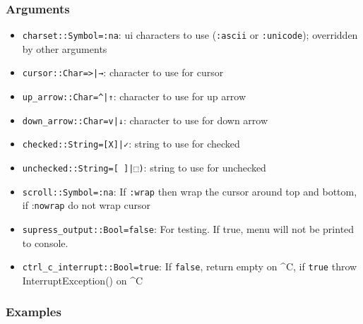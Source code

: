 \hypertarget{10322653734691696332}{}


\subsubsection{Arguments}



\begin{itemize}
\item \texttt{charset::Symbol=:na}: ui characters to use (\texttt{:ascii} or \texttt{:unicode}); overridden by other arguments


\item \texttt{cursor::Char={\textquotesingle}>{\textquotesingle}|{\textquotesingle}→{\textquotesingle}}: character to use for cursor


\item \texttt{up\_arrow::Char={\textquotesingle}{\textasciicircum}{\textquotesingle}|{\textquotesingle}↑{\textquotesingle}}: character to use for up arrow


\item \texttt{down\_arrow::Char={\textquotesingle}v{\textquotesingle}|{\textquotesingle}↓{\textquotesingle}}: character to use for down arrow


\item \texttt{checked::String={\textquotedbl}[X]{\textquotedbl}|{\textquotedbl}✓{\textquotedbl}}: string to use for checked


\item \texttt{unchecked::String={\textquotedbl}[ ]{\textquotedbl}|{\textquotedbl}⬚{\textquotedbl})}: string to use for unchecked


\item \texttt{scroll::Symbol=:na}: If \texttt{:wrap} then wrap the cursor around top and bottom, if :\texttt{nowrap} do not wrap cursor


\item \texttt{supress\_output::Bool=false}: For testing. If true, menu will not be printed to console.


\item \texttt{ctrl\_c\_interrupt::Bool=true}: If \texttt{false}, return empty on {\textasciicircum}C, if \texttt{true} throw InterruptException() on {\textasciicircum}C

\end{itemize}


\hypertarget{18222617908278532347}{}


\subsubsection{Examples}




